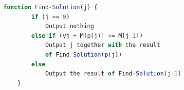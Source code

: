 \begin{lstlisting}[language=Javascript]
    function Find-Solution(j) {
        if (j == 0)
            Output nothing
        else if (vj + M[p(j)] >= M[j-1])
            Output j together with the result 
            of Find-Solution(p(j))
        else
            Output the result of Find-Solution(j-1)
    }
\end{lstlisting}